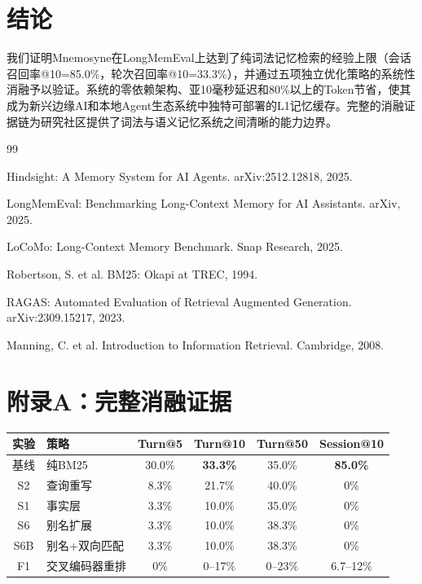 \documentclass[11pt,a4paper]{ctexart}
\begin{document}
\section{结论}

我们证明Mnemosyne在LongMemEval上达到了纯词法记忆检索的经验上限（会话召回率@10=85.0\%，轮次召回率@10=33.3\%），并通过五项独立优化策略的系统性消融予以验证。系统的零依赖架构、亚10毫秒延迟和80\%以上的Token节省，使其成为新兴边缘AI和本地Agent生态系统中独特可部署的L1记忆缓存。完整的消融证据链为研究社区提供了词法与语义记忆系统之间清晰的能力边界。

\begin{thebibliography}{99}

Hindsight: A Memory System for AI Agents. arXiv:2512.12818, 2025.

LongMemEval: Benchmarking Long-Context Memory for AI Assistants. arXiv, 2025.

LoCoMo: Long-Context Memory Benchmark. Snap Research, 2025.

Robertson, S. et al. BM25: Okapi at TREC, 1994.

RAGAS: Automated Evaluation of Retrieval Augmented Generation. arXiv:2309.15217, 2023.

Manning, C. et al. Introduction to Information Retrieval. Cambridge, 2008.

\end{thebibliography}

\section*{附录A：完整消融证据}

\begin{table}[h]
\centering
\small
\begin{tabular}{clcccc}
\toprule
\textbf{实验} & \textbf{策略} & \textbf{Turn@5} & \textbf{Turn@10} & \textbf{Turn@50} & \textbf{Session@10} \\
\midrule
基线 & 纯BM25 & 30.0\% & \textbf{33.3\%} & 35.0\% & \textbf{85.0\%} \\
S2 & 查询重写 & 8.3\% & 21.7\% & 40.0\% & 0\% \\
S1 & 事实层 & 3.3\% & 10.0\% & 35.0\% & 0\% \\
S6 & 别名扩展 & 3.3\% & 10.0\% & 38.3\% & 0\% \\
S6B & 别名+双向匹配 & 3.3\% & 10.0\% & 38.3\% & 0\% \\
F1 & 交叉编码器重排 & 0\% & 0–17\% & 0–23\% & 6.7–12\% \\
\bottomrule
\end{tabular}
\end{table}
\end{document}
